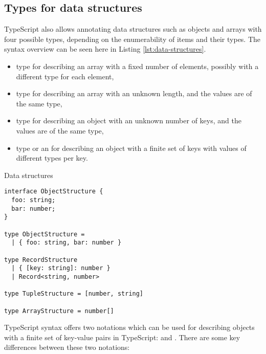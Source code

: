 \subsection{Types for data structures}\label{sec:typescript-data-structures}

TypeScript also allows annotating data structures such as objects and arrays with four possible types, depending on the enumerability of items and their types. The syntax overview can be seen here in Listing \ref{lst:data-structures}.

\begin{itemize}
  \item {} type for describing an array with a fixed number of elements, possibly with a different type for each element,
  \item {} type for describing an array with an unknown length, and the values are of the same type,
  \item {} type for describing an object with an unknown number of keys, and the values are of the same type,
  \item {} type or an  for describing an object with a finite set of keys with values of different types per key.
\end{itemize}

\begin{listing}[ht]
  \caption{Data structures}\label{lst:data-structures}
  \begin{verbatim}
interface ObjectStructure {
  foo: string;
  bar: number;
}

type ObjectStructure =  
  | { foo: string, bar: number }

type RecordStructure 
  | { [key: string]: number }
  | Record<string, number>

type TupleStructure = [number, string]

type ArrayStructure = number[]
\end{verbatim}
\end{listing}

TypeScript syntax offers two notations which can be used for describing objects with a finite set of key-value pairs in TypeScript:  and . There are some key differences between these two notations:

